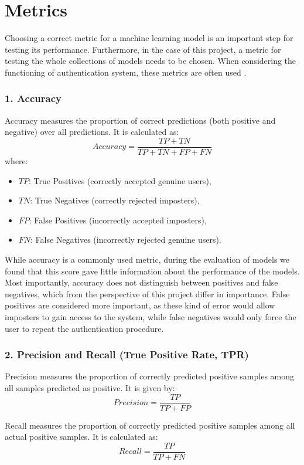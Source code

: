\section{Metrics}
Choosing a correct metric for a machine learning model is an important step for testing its performance. Furthermore, in the case of this project, a metric for testing the whole collections of models needs to be chosen.
When considering the functioning of authentication system, these metrics are often used \cite{traore2011continuous}. 

\subsubsection{1. Accuracy}
Accuracy measures the proportion of correct predictions (both positive and negative) over all predictions. It is calculated as:
\[
Accuracy = \frac{TP + TN}{TP + TN + FP + FN}
\]
where:
\begin{itemize}
	\item $TP$: True Positives (correctly accepted genuine users),
	\item $TN$: True Negatives (correctly rejected imposters),
	\item $FP$: False Positives (incorrectly accepted imposters),
	\item $FN$: False Negatives (incorrectly rejected genuine users).
\end{itemize}

While accuracy is a commonly used metric, during the evaluation of models we found that this score gave little information about the performance of the models. Most importantly, accuracy does not distinguish between positives and false negatives, which from the perspective of this project differ in importance. False positives are considered more important, as these kind of error would allow imposters to gain access to the system, while false negatives would only force the user to repeat the authentication procedure.

\subsubsection{2. Precision and Recall (True Positive Rate, TPR)}
Precision measures the proportion of correctly predicted positive samples among all samples predicted as positive. It is given by:
\[
Precision = \frac{TP}{TP + FP}
\]

Recall measures the proportion of correctly predicted positive samples among all actual positive samples. It is calculated as:
\[
Recall = \frac{TP}{TP + FN}
\]

